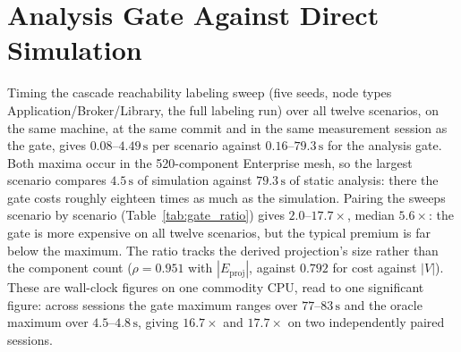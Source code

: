 \documentclass[preprint,3p]{elsarticle}
\begin{document}
\section{Analysis Gate Against Direct Simulation}
\label{supp:gate-ratio}

Timing the cascade reachability labeling sweep (five seeds, node types Application/Broker/Library, the full labeling run) over all twelve scenarios, on the same machine, at the same commit and in the same measurement session as the gate, gives $0.08$--$4.49\,\text{s}$ per scenario against $0.16$--$79.3\,\text{s}$ for the analysis gate. Both maxima occur in the 520-component Enterprise mesh, so the largest scenario compares $4.5\,\text{s}$ of simulation against $79.3\,\text{s}$ of static analysis: there the gate costs roughly eighteen times as much as the simulation. Pairing the sweeps scenario by scenario (Table~\ref{tab:gate_ratio}) gives $2.0$--$17.7\times$, median $5.6\times$: the gate is more expensive on all twelve scenarios, but the typical premium is far below the maximum. The ratio tracks the derived projection's size rather than the component count ($\rho = 0.951$ with $|E_{\text{proj}}|$, against $0.792$ for cost against $|V|$). These are wall-clock figures on one commodity CPU, read to one significant figure: across sessions the gate maximum ranges over $77$--$83\,\text{s}$ and the oracle maximum over $4.5$--$4.8\,\text{s}$, giving $16.7\times$ and $17.7\times$ on two independently paired sessions.
\end{document}
